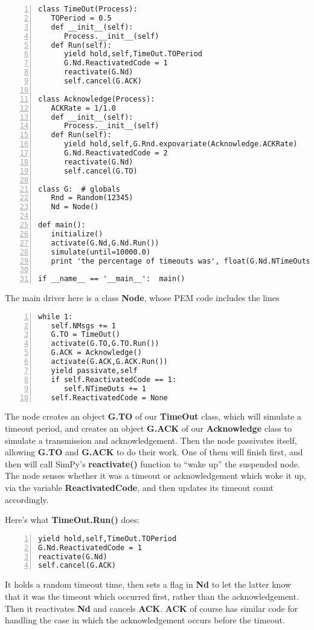 \documentclass[11pt]{article}
\begin{document}
\begin{Verbatim}[fontsize=\relsize{-2},numbers=left]
class TimeOut(Process):
   TOPeriod = 0.5
   def __init__(self):
      Process.__init__(self)  
   def Run(self):
      yield hold,self,TimeOut.TOPeriod
      G.Nd.ReactivatedCode = 1  
      reactivate(G.Nd)
      self.cancel(G.ACK)

class Acknowledge(Process):
   ACKRate = 1/1.0
   def __init__(self):
      Process.__init__(self)  
   def Run(self):
      yield hold,self,G.Rnd.expovariate(Acknowledge.ACKRate)
      G.Nd.ReactivatedCode = 2  
      reactivate(G.Nd)
      self.cancel(G.TO)

class G:  # globals
   Rnd = Random(12345)
   Nd = Node()

def main():
   initialize()  
   activate(G.Nd,G.Nd.Run())
   simulate(until=10000.0)
   print 'the percentage of timeouts was', float(G.Nd.NTimeOuts)/G.Nd.NMsgs

if __name__ == '__main__':  main()
\end{Verbatim}

The main driver here is a class {\bf Node}, whose PEM code includes the lines

\begin{Verbatim}[fontsize=\relsize{-2},numbers=left]
while 1:
   self.NMsgs += 1
   G.TO = TimeOut()
   activate(G.TO,G.TO.Run())
   G.ACK = Acknowledge()
   activate(G.ACK,G.ACK.Run())
   yield passivate,self 
   if self.ReactivatedCode == 1:
      self.NTimeOuts += 1
   self.ReactivatedCode = None
\end{Verbatim}

The node creates an object {\bf G.TO} of our {\bf TimeOut} class, which
will simulate a timeout period, and creates an object {\bf G.ACK} of our
{\bf Acknowledge} class to simulate a transmission and acknowledgement.
Then the node passivates itself, allowing {\bf G.TO} and {\bf G.ACK} to
do their work.  One of them will finish first, and then will call SimPy's
{\bf reactivate()} function to ``wake up'' the suspended node.  The node
senses whether it was a timeout or acknowledgement which woke it up, via
the variable {\bf ReactivatedCode}, and then updates its timeout count
accordingly.

Here's what {\bf TimeOut.Run()} does:

\begin{Verbatim}[fontsize=\relsize{-2},numbers=left]
yield hold,self,TimeOut.TOPeriod
G.Nd.ReactivatedCode = 1  
reactivate(G.Nd)
self.cancel(G.ACK)
\end{Verbatim}

It holds a random timeout time, then sets a flag in {\bf Nd} to let the
latter know that it was the timeout which occurred first, rather than
the acknowledgement.  Then it reactivates {\bf Nd} and cancels {\bf
ACK}. {\bf ACK} of course has similar code for handling the case in
which the acknowledgement occurs before the timeout.
\end{document}
